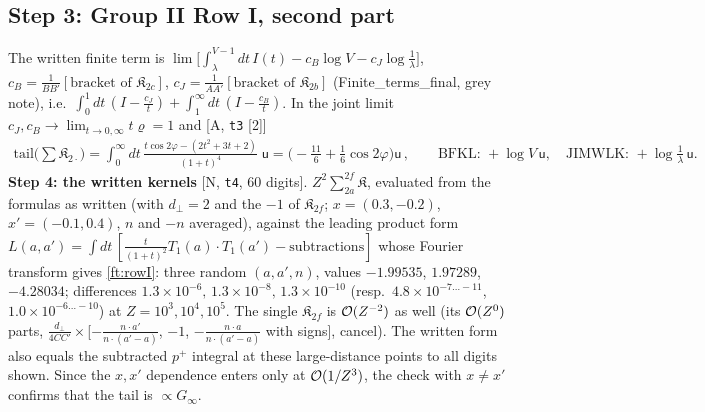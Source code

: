 \subsection{Step 3: Group II Row I, second part}
\noindent The written finite term is $\lim\big[\int_{\lambda}^{V-1}dt\,I(t)-c_{B}\log V-c_{J}\log\frac1\lambda\big]$, $c_{B}=\frac{1}{BB'}[\text{bracket of }\mathfrak{K}_{2c}]$, $c_{J}=\frac{1}{AA'}[\text{bracket of }\mathfrak{K}_{2b}]$ (Finite\_terms\_final, grey note), i.e.\ $\int_{0}^{1}dt\,(I-\frac{c_{J}}{t})+\int_{1}^{\infty}dt\,(I-\frac{c_{B}}{t})$. In the joint limit $c_{J},c_{B}\to\lim_{t\to0,\infty}t\varrho=1$ and [A, \texttt{t3} [2]]
\begin{align}
\text{tail}\Big(\sum\mathfrak{K}_{2\cdot}\Big)=\int_{0}^{\infty}dt\,\frac{t\cos2\varphi-(2t^{2}+3t+2)}{(1+t)^{4}}\;\mathsf{u}=\Big(-\frac{11}{6}+\frac16\cos2\varphi\Big)\mathsf{u}\,,\qquad \text{BFKL: }+\log V\,\mathsf{u},\quad\text{JIMWLK: }+\log\tfrac1\lambda\,\mathsf{u}.
\label{ft:rowI}
\end{align}
\textbf{Step 4: the written kernels} [N, \texttt{t4}, 60 digits]. $Z^{2}\sum_{2a}^{2f}\mathfrak{K}$, evaluated from the formulas as written (with $d_{\perp}=2$ and the $-1$ of $\mathfrak{K}_{2f}$; $x=(0.3,-0.2)$, $x'=(-0.1,0.4)$, $n$ and $-n$ averaged), against the leading product form $L(a,a')=\int dt\,[\frac{t}{(1+t)^{2}}T_{1}(a)\!\cdot\!T_{1}(a')-\text{subtractions}]$ whose Fourier transform gives \eqref{ft:rowI}: three random $(a,a',n)$, values $-1.99535$, $1.97289$, $-4.28034$; differences $1.3\times10^{-6},\,1.3\times10^{-8},\,1.3\times10^{-10}$ (resp.\ $4.8\times10^{-7\dots-11}$, $1.0\times10^{-6\dots-10}$) at $Z=10^{3},10^{4},10^{5}$. The single $\mathfrak{K}_{2f}$ is ${\cal O}(Z^{-2})$ as well (its ${\cal O}(Z^{0})$ parts, $\frac{d_{\perp}}{4CC'}\times$[$-\frac{n\cdot a'}{n\cdot(a'-a)}$, $-1$, $-\frac{n\cdot a}{n\cdot(a'-a)}$ with signs], cancel). The written form also equals the subtracted $p^{+}$ integral at these large-distance points to all digits shown. Since the $x,x'$ dependence enters only at ${\cal O}(1/Z^{3})$, the check with $x\ne x'$ confirms that the tail is $\propto G_{\infty}$.

